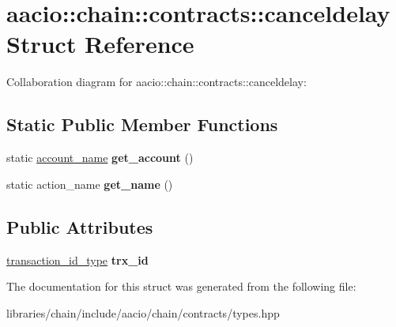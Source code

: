 \hypertarget{structaacio_1_1chain_1_1contracts_1_1canceldelay}{}\section{aacio\+:\+:chain\+:\+:contracts\+:\+:canceldelay Struct Reference}
\label{structaacio_1_1chain_1_1contracts_1_1canceldelay}


Collaboration diagram for aacio\+:\+:chain\+:\+:contracts\+:\+:canceldelay\+:
\subsection*{Static Public Member Functions}
\begin{DoxyCompactItemize}
\item 
\mbox{\label{structaacio_1_1chain_1_1contracts_1_1canceldelay_a857413fc219c0db600be11d2acf6f3bf}} 
static \mbox{\hyperlink{structaacio_1_1chain_1_1name}{account\+\_\+name}} {\bfseries get\+\_\+account} ()
\item 
\mbox{\label{structaacio_1_1chain_1_1contracts_1_1canceldelay_a758fc11b35c3180e0f3c358f599051b8}} 
static action\+\_\+name {\bfseries get\+\_\+name} ()
\end{DoxyCompactItemize}
\subsection*{Public Attributes}
\begin{DoxyCompactItemize}
\item 
\mbox{\label{structaacio_1_1chain_1_1contracts_1_1canceldelay_a832c1b48d8bcedff588faf39de4ae41f}} 
\mbox{\hyperlink{classfc_1_1sha256}{transaction\+\_\+id\+\_\+type}} {\bfseries trx\+\_\+id}
\end{DoxyCompactItemize}


The documentation for this struct was generated from the following file\+:\begin{DoxyCompactItemize}
\item 
libraries/chain/include/aacio/chain/contracts/types.\+hpp\end{DoxyCompactItemize}
